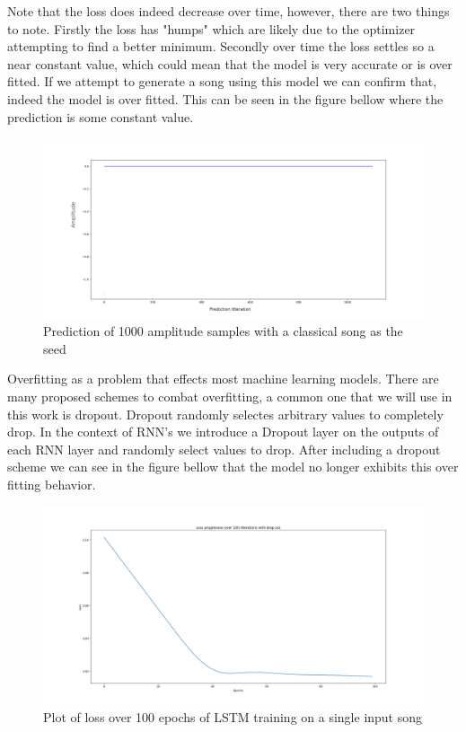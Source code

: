 \documentclass{article}
\begin{document}
Note that the loss does indeed decrease over time, however, there are two things to note. Firstly the loss has "humps" which are likely due to the optimizer attempting to find a better minimum. Secondly over time the loss settles so a near constant value, which could mean that the model is very accurate or is over fitted. If we attempt to generate a song using this model we can confirm that, indeed the model is over fitted. This can be seen in the figure bellow where the prediction is some constant value. 
\begin{figure}[H]
\caption{Prediction of 1000 amplitude samples with a classical song as the seed}
\includegraphics[scale=0.35]{overfit_1.png}
\end{figure}
Overfitting as a problem that effects most machine learning models. There are many proposed schemes to combat overfitting, a common one that we will use in this work is dropout. Dropout randomly selectes arbitrary values to completely drop. In the context of RNN's we introduce a Dropout layer on the outputs of each RNN layer and randomly select values to drop. After including a dropout scheme we can see in the figure bellow that the model no longer exhibits this over fitting behavior.
\begin{figure}[H]
\caption{Plot of loss over 100 epochs of LSTM training on a single input song}
\includegraphics[scale=0.35]{loss_dropout_100itr.png}
\end{figure}
\end{document}

